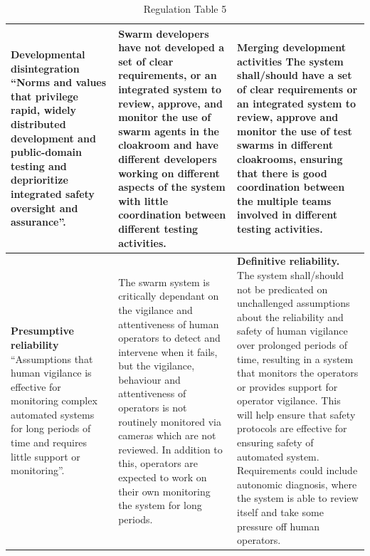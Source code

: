 \documentclass[lettersize,journal]{IEEEtran}
\begin{document}
\begin{landscape}
\begin{table}[]
\begin{tabular}{|p{0.3\textheight}|p{0.3\textheight}|p{0.4\textheight}|}
        \hline
        \textbf{Developmental disintegration} ``Norms and values that privilege rapid, widely distributed development and public-domain testing and deprioritize integrated safety oversight and assurance”. \cite{macrae2021learning} & Swarm developers have not developed a set of clear requirements, or an integrated system to review, approve, and monitor the use of swarm agents in the cloakroom and have different developers working on different aspects of the system with little coordination between different testing activities. & \textbf{Merging development activities} The system shall/should have a set of clear requirements or an integrated system to review, approve and monitor the use of test swarms in different cloakrooms, ensuring that there is good coordination between the multiple teams involved in different testing activities. \\
        \hline
        \textbf{Presumptive reliability } ``Assumptions that human vigilance is effective for monitoring complex automated systems for long periods of time and requires little support or monitoring”. \cite{macrae2021learning} & The swarm system is critically dependant on the vigilance and attentiveness of human operators to detect and intervene when it fails, but the vigilance, behaviour and attentiveness of operators is not routinely monitored via cameras which are not reviewed. In addition to this, operators are expected to work on their own monitoring the system for long periods. & \textbf{Definitive reliability.} The system shall/should not be predicated on unchallenged assumptions about the reliability and safety of human vigilance over prolonged periods of time, resulting in a system that monitors the operators or provides support for operator vigilance. This will help ensure that safety protocols are effective for ensuring safety of automated system. Requirements could include autonomic diagnosis, where the system is able to review itself and take some pressure off human operators. \\
        \hline
    \end{tabular}
    \caption{Regulation Table 5}
    \label{tab:tab_5}
\end{table}
\end{landscape}

%
%


\vfill
\end{document}
